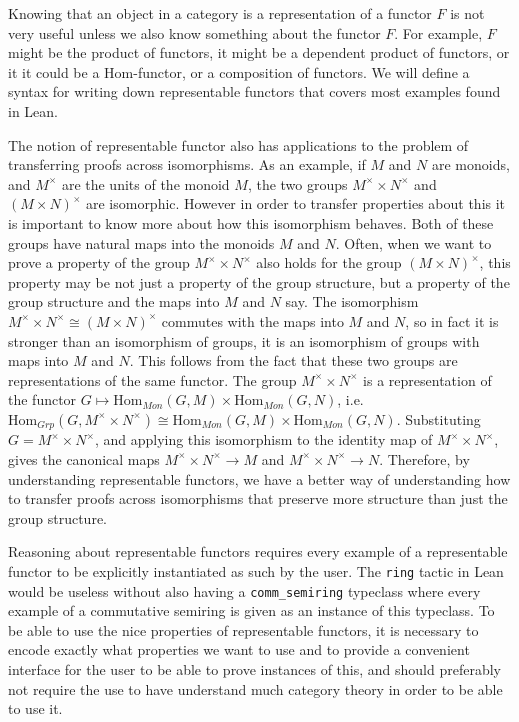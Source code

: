\documentclass[12pt]{article} %
\theoremstyle{definition}
\theoremstyle{definition}
\theoremstyle{definition}
\theoremstyle{definition}
\begin{document}
Knowing that an object in a category is a representation of a functor $F$ is not very useful unless we also know
something about the functor $F$. For example, $F$ might be the product of functors, it might be a dependent
product of functors, or it it could be a Hom-functor, or a composition of functors. We will define
a syntax for writing down representable functors that covers most examples found in Lean.

The notion of representable functor also has applications to the problem of transferring proofs across isomorphisms.
As an example, if $M$ and $N$ are monoids, and $M^{\times}$ are the units of the monoid $M$, the two groups $M^{\times} \times N^{\times}$
and $(M \times N)^{\times}$ are isomorphic. However in order to transfer properties about this it is important to know
more about how this isomorphism behaves. Both of these groups have natural maps into the monoids $M$ and $N$.
Often, when we want to prove a property of the group $M^{\times} \times N^{\times}$ also holds for the group
$(M \times N)^{\times}$, this property may be not just a property of the group structure, but a property of the group structure
and the maps into $M$ and $N$ say. The isomorphism $M^{\times} \times N^{\times} \cong (M \times N)^{\times}$ commutes with the maps
into $M$ and $N$, so in fact it is stronger than an isomorphism of groups, it is an isomorphism of groups with maps into $M$ and $N$.
This follows from the fact that these two groups are representations of the same functor. The group $M^{\times} \times N^{\times}$
is a representation of the functor $G \mapsto \text{Hom}_{Mon}(G, M) \times \text{Hom}_{Mon}(G, N)$, i.e.
$\text{Hom}_{Grp}(G, M^{\times} \times N^{\times}) \cong \text{Hom}_{Mon}(G, M) \times \text{Hom}_{Mon}(G, N)$.
Substituting $G=M^{\times} \times N^{\times}$, and applying this isomorphism to the identity map of $M^{\times} \times N^{\times}$,
gives the canonical maps $M^{\times} \times N^{\times} \to M$ and $M^{\times} \times N^{\times} \to N$. Therefore, by understanding
representable functors, we have a better way of understanding how to transfer proofs across isomorphisms that preserve more structure
than just the group structure.


Reasoning about representable functors requires every example of a representable functor to be explicitly
instantiated as such by the user. The \lstinline{ring} tactic in Lean would be useless without
also having a \lstinline{comm_semiring} typeclass where every example of a commutative semiring is
given as an instance of this typeclass. To be able to use the nice properties of representable functors,
it is necessary to encode exactly what properties we want to use and to provide a convenient interface for
the user to be able to prove instances of this, and should preferably not require the use to have understand
much category theory in order to be able to use it.
\end{document}
